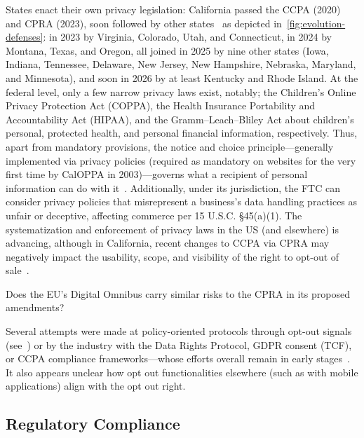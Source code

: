 \label{sec:us-regulations}
%
States enact their own privacy legislation: California passed the CCPA (2020) and CPRA (2023), soon followed by other states~\cite{birrellSoKTechnicalImplementation2024,vannortwickSettingBarLow2022} as depicted in~\autoref{fig:evolution-defenses}: in 2023 by Virginia, Colorado, Utah, and Connecticut, in 2024 by Montana, Texas, and Oregon, all joined in 2025 by nine other states (Iowa, Indiana, Tennessee, Delaware, New Jersey, New Hampshire, Nebraska, Maryland, and Minnesota), and soon in 2026 by at least Kentucky and Rhode Island.
%
At the federal level, only a few narrow privacy laws exist, notably; the Children’s Online Privacy Protection Act (COPPA), the Health Insurance Portability and Accountability Act (HIPAA), and the Gramm–Leach–Bliley Act about children’s personal, protected health, and personal financial information, respectively.
%
Thus, apart from mandatory provisions, the notice and choice principle---generally implemented via privacy policies (required as mandatory on websites for the very first time by CalOPPA in 2003)---governs what a recipient of personal information can do with it~\cite{zimmeckInformationPrivacyLaw2013,schaubDesignSpaceEffective2015}.
%
Additionally, under its jurisdiction, the FTC can consider privacy policies that misrepresent a business's data handling practices as unfair or deceptive, affecting commerce per 15 U.S.C. §45(a)(1).
%
The systematization and enforcement of privacy laws in the US (and elsewhere) is advancing, although in California, recent changes to CCPA via CPRA may negatively impact the usability, scope, and visibility of the right to opt-out of sale~\cite{charatanTwoStepsForward2024}.

\begin{opbox}
Does the EU's Digital Omnibus carry similar risks to the CPRA in its proposed amendments?
\end{opbox}


\label{sec:policy-solutions}
Several attempts were made at policy-oriented protocols through opt-out signals (see~) or by the industry with the Data Rights Protocol, GDPR consent (TCF), or CCPA compliance frameworks---whose efforts overall remain in early stages~\cite{hilsMeasuringEmergenceConsent2020,matteCookieBannersRespect2020,azizJohnnyStillCant2024}. It also appears unclear how opt out functionalities elsewhere (such as with mobile applications) align with the opt out right.


\subsection{Regulatory Compliance}

